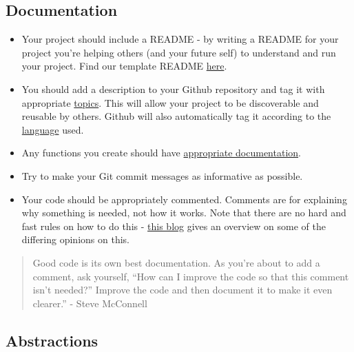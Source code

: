 \documentclass[]{book}
\begin{document}
\hypertarget{readme}{%
\subsection*{Documentation}\label{readme}}

\begin{itemize}
\item
  Your project should include a README - by writing a README for your project you're helping others (and your future self) to understand and run your project. Find our template README \href{https://github.com/moj-analytical-services/our-coding-standards/blob/master/README_template.md}{here}.
\item
  You should add a description to your Github repository and tag it with appropriate \href{https://help.github.com/en/github/administering-a-repository/classifying-your-repository-with-topics}{topics}. This will allow your project to be discoverable and reusable by others. Github will also automatically tag it according to the \href{https://help.github.com/en/github/creating-cloning-and-archiving-repositories/about-repository-languages}{language} used.
\item
  Any functions you create should have \protect\hyperlink{functions}{appropriate documentation}.
\item
  Try to make your Git commit messages as informative as possible.
\item
  Your code should be appropriately commented. Comments are for explaining why something is needed, not how it works. Note that there are no hard and fast rules on how to do this - \href{https://blog.ndepend.com/correct-way-comment-code/}{this blog} gives an overview on some of the differing opinions on this.
\end{itemize}

\begin{quote}
Good code is its own best documentation. As you're about to add a comment, ask yourself, ``How can I improve the code so that this comment isn't needed?'' Improve the code and then document it to make it even clearer.'' - Steve McConnell
\end{quote}

\hypertarget{functions}{%
\subsection*{Abstractions}\label{functions}}
\end{document}
